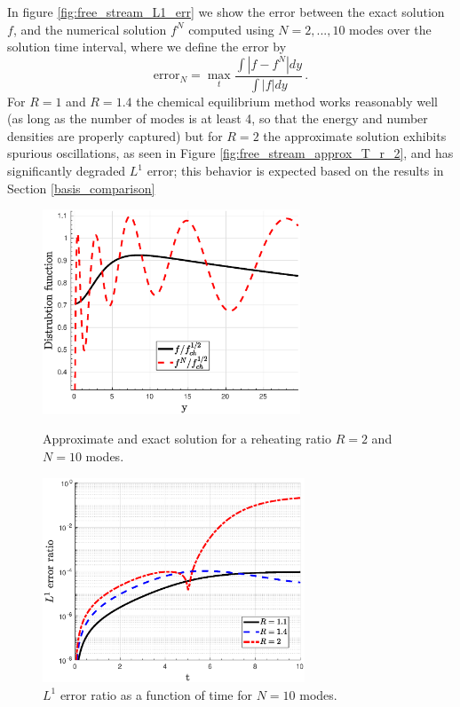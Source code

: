 In figure  \ref{fig:free_stream_L1_err} we show the error between the exact solution $f$, and the numerical solution $f^N$ computed using $N=2,...,10$ modes over the solution time interval, where we define the error by
\begin{equation}\label{f_err}
\text{error}_N=\max_{t} \frac{\int |f-f^N|dy}{\int |f|dy}\,.
\end{equation}
For $R=1$ and $R=1.4$  the chemical equilibrium method works reasonably well (as long as the number of modes is at least 4, so that the energy and number densities are properly captured) but for $R=2$ the approximate solution exhibits spurious oscillations, as seen in Figure \ref{fig:free_stream_approx_T_r_2}, and has significantly degraded $L^1$ error;  this behavior is expected based on the results in Section \ref{basis_comparison}
\begin{figure}[ht]
\begin{minipage}[t]{0.5\linewidth}
\centerline{\includegraphics[height=6.1cm]{06-appendix/SpectralMethodBoltzmann/Figures/free_stream_approx_T_r_2.eps}}
\caption{Approximate and exact solution for a reheating ratio $R=2$ and $N=10$ modes.}\label{fig:free_stream_approx_T_r_2}
 \end{minipage}
 \hspace{0.5cm}
 \begin{minipage}[t]{0.5\linewidth}
\centerline{\includegraphics[height=6.1cm]{06-appendix/SpectralMethodBoltzmann/Figures/free_stream_L1_err_time.eps}}
\caption{$L^1$ error ratio as a function of time for $N=10$ modes.}\label{fig:free_stream_L1_err_time}
\end{minipage}
\end{figure}
